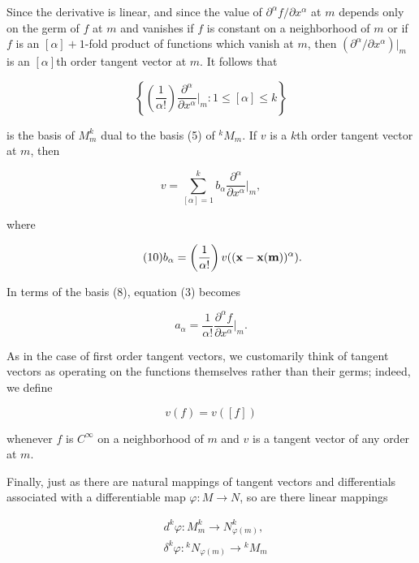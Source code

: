 Since the derivative is linear, and since the value of $\partial^{\alpha} f/\partial x^{\alpha}$ at $m$ depends only on the germ of $f$ at $m$ and vanishes if $f$ is constant on a neighborhood of $m$ or if $f$ is an $[\alpha]+1$-fold product of functions which vanish at $m$, then $(\partial^{\alpha}/\partial x^{\alpha})\big|_m$ is an $[\alpha]$th order tangent vector at $m$. It follows that

\begin{equation}
	\tag{8}\label{eq:1.26:8}
	\left\{\left(\frac{1}{\alpha!}\right)\frac{\partial^{\alpha}}{\partial x^{\alpha}}\bigg|_{m}:1\leq[\alpha]\leq k\right\}
\end{equation}

is the basis of $M_{m}^{k}$ dual to the basis (5) of $^{k}M_{m}$. If $v$ is a $k$th order tangent vector at $m$, then

\begin{equation}
	\tag{9}\label{eq:1.26:9}
	v=\sum_{[\alpha]=1}^{k}b_{\alpha}\frac{\partial^{\alpha}}{\partial x^{\alpha}}\bigg|_{m},
\end{equation}

where

\begin{equation}
	\tag{10}\label{eq:1.26:10}
	b_{\alpha}=\left(\frac{1}{\alpha!}\right)v(({\bf x}-{\bf x}({\bf m}))^{\alpha}).
\end{equation}

In terms of the basis (8), equation (3) becomes

\begin{equation}
	\tag{11}\label{eq:1.26:11}
	a_{\alpha}=\frac{1}{\alpha!}\frac{\partial^{\alpha}f}{\partial x^{\alpha}}\bigg|_{m}.
\end{equation}

As in the case of first order tangent vectors, we customarily think of tangent vectors as operating on the functions themselves rather than their germs; indeed, we define

\begin{equation}
	\tag{12}\label{eq:1.26:12}
	v(f)=v([f])
\end{equation}

whenever $f$ is $C^{\infty}$ on a neighborhood of $m$ and $v$ is a tangent vector of any order at $m$.

Finally, just as there are natural mappings of tangent vectors and differentials associated with a differentiable map $\varphi\colon M\to N$, so are there linear mappings

\begin{equation}
	\tag{13}\label{eq:1.26:13}
	\begin{aligned}{}&{{}d^{k}\varphi\colon M_{m}^{k}\to N_{\varphi(m)}^{k},}\\ {}&{{}\delta^{k}\varphi\colon{}^{k}N_{\varphi(m)}\to{}^{k}M_{m}}\\ \end{aligned}
\end{equation}


